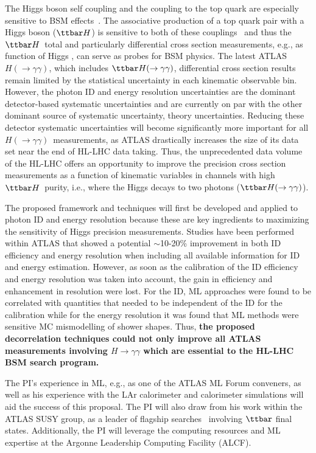 \documentclass[letter, USenglish, 11pt, subfigure]{article}
\newcommand{\tth}{\ensuremath{\ttbar H}}
\newcommand{\tthyy}{\ensuremath{\ttbar H(\to\gamma\gamma)}}
\newcommand{\hyy}{\ensuremath{H(\to\gamma\gamma)}}
\begin{document}
The Higgs boson self coupling and the coupling to the top quark are especially sensitive to BSM effects~\cite{Agrawal_2020}. The associative production of a top quark pair with a Higgs boson (\tth) is sensitive to both of these couplings~\cite{Maltoni_2017} and thus the \tth\ total and particularly differential cross section measurements, e.g., as function of Higgs \pt, can serve as probes for BSM physics. The latest ATLAS \hyy, which includes \tthyy, differential cross section results~\cite{ATLAS_STXS} remain limited by the statistical uncertainty in each kinematic observable bin. However, the photon ID and energy resolution uncertainties are the dominant detector-based systematic uncertainties and are currently on par with the other dominant source of systematic uncertainty, theory uncertainties. Reducing these detector systematic uncertainties will become significantly more important for all \hyy\ measurements, as ATLAS drastically increases the size of its data set near the end of HL-LHC data taking. Thus, the unprecedented data volume of the HL-LHC offers an opportunity to improve the precision cross section measurements as a function of kinematic variables in channels with high \tth\ purity, i.e., where the Higgs decays to two photons (\tthyy).

The proposed framework and techniques will first be developed and applied to photon ID and energy resolution because these are key ingredients to maximizing the sensitivity of Higgs precision measurements. Studies have been performed within ATLAS that showed a potential $\sim$10-20\% improvement in both ID efficiency and energy resolution when including all available information for ID and energy estimation. However, as soon as the calibration of the ID efficiency and energy resolution was taken into account, the gain in efficiency and enhancement in resolution were lost. For the ID, ML approaches were found to be correlated with quantities that needed to be independent of the ID for the calibration while for the energy resolution it was found that ML methods were sensitive MC mismodelling of shower shapes. Thus, {\bf the proposed decorrelation techniques could not only improve all ATLAS measurements involving $H\to\gamma\gamma$ which are essential to the HL-LHC BSM search program.}

The PI's experience in ML, e.g., as one of the ATLAS ML Forum conveners, as well as his experience with the LAr calorimeter and calorimeter simulations will aid the success of this proposal. The PI will also draw from his work within the ATLAS SUSY group, as a leader of flagship searches~\cite{stop0L_1,stopRun1,stop0L_2,stop0L_3} involving $\ttbar$ final states. Additionally, the PI will leverage the computing resources and ML expertise at the Argonne Leadership Computing Facility (ALCF).
\end{document}
